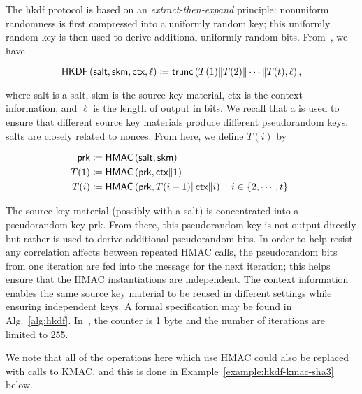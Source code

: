 The \gls{hkdf} protocol is based on an
\emph{extract-then-expand} principle:
nonuniform randomness is first compressed into a uniformly random key;
this uniformly random key is then used to derive additional
uniformly random bits.
From~\cite{HKDF2010}, we have

\begin{equation}
    \textsf{HKDF}\left( \textsf{salt}, \textsf{skm}, \textsf{ctx}, \ell \right)
        \coloneqq{} \textsf{trunc}\left( T(1) \| T(2) \| \cdots \| T(t), \ell \right),
\end{equation}

\noindent
where \textsf{salt} is a \gls{salt},
\textsf{skm} is the source key material,
\textsf{ctx} is the context information,
and $\ell$ is the length of output in bits.
We recall that a  is used to ensure
that different source key materials produce different pseudorandom keys.
\Glspl{salt} are closely related to \glspl{nonce}.
From here, we define $T(i)$ by

\begin{align}
    \textsf{prk} &\coloneqq{} \textsf{HMAC}\left( \textsf{salt},\textsf{skm} \right)
            \nonumber\\
    T(1) &\coloneqq{} \textsf{HMAC}\left( \textsf{prk}, \textsf{ctx}\|1 \right)
            \nonumber\\
    T(i) &\coloneqq{} \textsf{HMAC}\left( \textsf{prk},T(i-1)\|
        \textsf{ctx}\|i \right) \quad i\in\left\{ 2,\cdots,t \right\}.
\end{align}

\noindent
The source key material (possibly with a \gls{salt}) is concentrated
into a pseudorandom key \textsf{prk}.
From there, this pseudorandom key is not output directly
but rather is used to derive additional pseudorandom bits.
In order to help resist any correlation affects between repeated
\textsf{HMAC} calls,
the pseudorandom bits from one iteration are fed into
the message for the next iteration;
this helps ensure that the \textsf{HMAC} instantiations
are independent.
The context information enables the same source key material
to be reused in different settings while ensuring
independent keys.
A formal specification may be found in Alg.~\ref{alg:hkdf}.
In~\cite{rfc5869}, the counter is 1 byte
and the number of iterations are limited to 255.



We note that all of the operations here which use \textsf{HMAC}
could also be replaced with calls to \textsf{KMAC},
and this is done in Example~\ref{example:hkdf-kmac-sha3} below.

